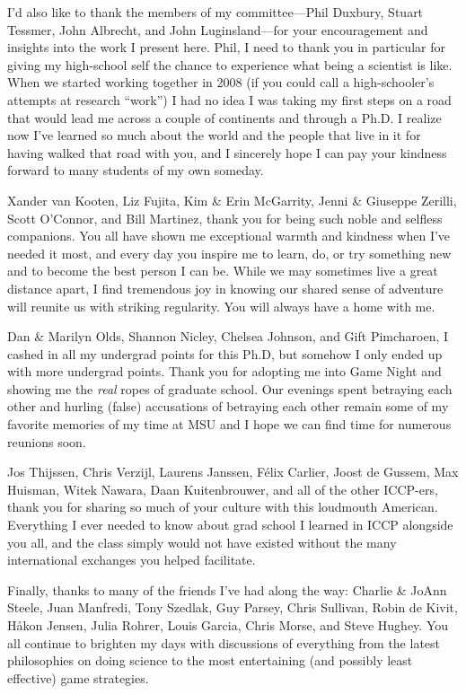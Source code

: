 \documentclass[mixedtoc]{msu-thesis-custom}
\begin{document}
I'd also like to thank the members of my committee---Phil Duxbury, Stuart
Tessmer, John Albrecht, and John Luginsland---for your encouragement and
insights into the work I present here. Phil, I need to thank you in particular
for giving my high-school self the chance to experience what being a scientist
is like. When we started working together in 2008 (if you could call a
high-schooler's attempts at research ``work'') I had no idea I was taking my
first steps on a road that would lead me across a couple of continents and
through a Ph.D. I realize now I've learned so much about the world and the
people that live in it for having walked that road with you, and I sincerely
hope I can pay your kindness forward to many students of my own someday.

Xander van Kooten, Liz Fujita, Kim \& Erin McGarrity, Jenni \& Giuseppe
Zerilli, Scott O'Connor, and Bill Martinez, thank you for being such noble and
selfless companions. You all have shown me exceptional warmth and kindness when
I've needed it most, and every day you inspire me to learn, do, or try
something new and to become the best person I can be. While we may sometimes
live a great distance apart, I find tremendous joy in knowing our shared sense
of adventure will reunite us with striking regularity. You will always have a
home with me.

Dan \& Marilyn Olds, Shannon Nicley, Chelsea Johnson, and Gift Pimcharoen, I
cashed in all my undergrad points for this Ph.D, but somehow I only ended up
with more undergrad points. Thank you for adopting me into Game Night and
showing me the \emph{real} ropes of graduate school. Our evenings spent
betraying each other and hurling (false) accusations of betraying each other
remain some of my favorite memories of my time at MSU and I hope we can find
time for numerous reunions soon.

Jos Thijssen, Chris Verzijl, Laurens Janssen, F\'elix Carlier, Joost de Gussem,
Max Huisman, Witek Nawara, Daan Kuitenbrouwer, and all of the other ICCP-ers,
thank you for sharing so much of your culture with this loudmouth American.
Everything I ever needed to know about grad school I learned in ICCP alongside
you all, and the class simply would not have existed without the many 
international exchanges you helped facilitate.

Finally, thanks to many of the friends I've had along the way: Charlie \& JoAnn
Steele, Juan Manfredi, Tony Szedlak, Guy Parsey, Chris Sullivan, Robin de
Kivit, H\aa kon Jensen, Julia Rohrer, Louis Garcia, Chris Morse, and Steve
Hughey. You all continue to brighten my days with discussions of everything
from the latest philosophies on doing science to the most entertaining (and
possibly least effective) game strategies. 
\end{document}
